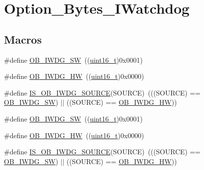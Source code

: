 \hypertarget{group___option___bytes___i_watchdog}{}\section{Option\+\_\+\+Bytes\+\_\+\+I\+Watchdog}
\label{group___option___bytes___i_watchdog}
\subsection*{Macros}
\begin{DoxyCompactItemize}
\item 
\#define \hyperlink{group___option___bytes___i_watchdog_ga5a357e232c955444c3f2ccb9a937ffce}{O\+B\+\_\+\+I\+W\+D\+G\+\_\+\+SW}~((\hyperlink{_p_e___types_8h_a1f1825b69244eb3ad2c7165ddc99c956}{uint16\+\_\+t})0x0001)
\item 
\#define \hyperlink{group___option___bytes___i_watchdog_gadfcbfa963d79c339ec8e2d5a7734e47a}{O\+B\+\_\+\+I\+W\+D\+G\+\_\+\+HW}~((\hyperlink{_p_e___types_8h_a1f1825b69244eb3ad2c7165ddc99c956}{uint16\+\_\+t})0x0000)
\item 
\#define \hyperlink{group___option___bytes___i_watchdog_gaf2871652c08e76499d9449be6556f12c}{I\+S\+\_\+\+O\+B\+\_\+\+I\+W\+D\+G\+\_\+\+S\+O\+U\+R\+CE}(S\+O\+U\+R\+CE)~(((S\+O\+U\+R\+CE) == \hyperlink{group___option___bytes___i_watchdog_ga5a357e232c955444c3f2ccb9a937ffce}{O\+B\+\_\+\+I\+W\+D\+G\+\_\+\+SW}) $\vert$$\vert$ ((S\+O\+U\+R\+CE) == \hyperlink{group___option___bytes___i_watchdog_gadfcbfa963d79c339ec8e2d5a7734e47a}{O\+B\+\_\+\+I\+W\+D\+G\+\_\+\+HW}))
\item 
\#define \hyperlink{group___option___bytes___i_watchdog_ga5a357e232c955444c3f2ccb9a937ffce}{O\+B\+\_\+\+I\+W\+D\+G\+\_\+\+SW}~((\hyperlink{_p_e___types_8h_a1f1825b69244eb3ad2c7165ddc99c956}{uint16\+\_\+t})0x0001)
\item 
\#define \hyperlink{group___option___bytes___i_watchdog_gadfcbfa963d79c339ec8e2d5a7734e47a}{O\+B\+\_\+\+I\+W\+D\+G\+\_\+\+HW}~((\hyperlink{_p_e___types_8h_a1f1825b69244eb3ad2c7165ddc99c956}{uint16\+\_\+t})0x0000)
\item 
\#define \hyperlink{group___option___bytes___i_watchdog_gaf2871652c08e76499d9449be6556f12c}{I\+S\+\_\+\+O\+B\+\_\+\+I\+W\+D\+G\+\_\+\+S\+O\+U\+R\+CE}(S\+O\+U\+R\+CE)~(((S\+O\+U\+R\+CE) == \hyperlink{group___option___bytes___i_watchdog_ga5a357e232c955444c3f2ccb9a937ffce}{O\+B\+\_\+\+I\+W\+D\+G\+\_\+\+SW}) $\vert$$\vert$ ((S\+O\+U\+R\+CE) == \hyperlink{group___option___bytes___i_watchdog_gadfcbfa963d79c339ec8e2d5a7734e47a}{O\+B\+\_\+\+I\+W\+D\+G\+\_\+\+HW}))
\end{DoxyCompactItemize}


